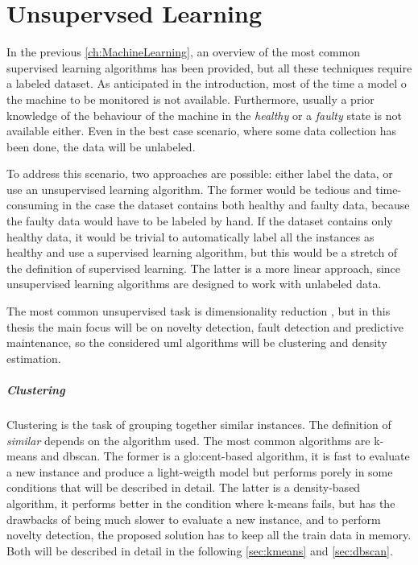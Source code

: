 \chapter{Unsupervsed Learning}
\label{ch:Unsupervised}

In the previous \autoref{ch:MachineLearning}, an overview of the most common supervised learning algorithms has been provided, but all these techniques require a labeled dataset. As anticipated in the introduction, most of the time a model o the machine to be monitored is not available. Furthermore, usually a prior knowledge of the behaviour of the machine in the \emph{healthy} or a \emph{faulty} state is not available either. Even in the best case scenario, where some data collection has been done, the data will be unlabeled. 

To address this scenario, two approaches are possible: either label the data, or use an unsupervised learning algorithm. The former would be tedious and time-consuming in the case the dataset contains both healthy and faulty data, because the faulty data would have to be labeled by hand. If the dataset contains only healthy data, it would be trivial to automatically label all the instances as healthy and use a supervised learning algorithm, but this would be a stretch of the definition of supervised learning. The latter is a more linear approach, since unsupervised learning algorithms are designed to work with unlabeled data.

The most common unsupervised task is dimensionality reduction , but in this thesis the main focus will be on novelty detection, fault detection and predictive maintenance, so the considered \gls{uml} algorithms will be clustering and density estimation.

\paragraph[]{Clustering}
Clustering is the task of grouping together similar instances. The definition of \emph{similar} depends on the algorithm used. The most common algorithms are {k-means} and \gls{dbscan}. The former is a \gls{glo:cent}-based algorithm, it is fast to evaluate a new instance and produce a light-weigth model but performs porely in some conditions that will be described in detail. The latter is a density-based algorithm, it performs better in the condition where k-means fails, but has the drawbacks of being much slower to evaluate a new instance, and to perform novelty detection, the proposed solution has to keep all the train data in memory. Both will be described in detail in the following \autoref{sec:kmeans} and \autoref{sec:dbscan}.

